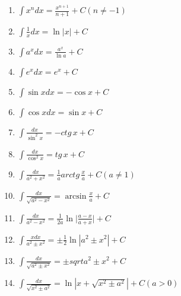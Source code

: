 \documentclass[12pt]{article}
\begin{document}
    \begin{enumerate}
        \item $\int x^n d x = \frac{x^{n+1}}{n+1} + C (n \neq -1)$
        \item $\int \frac 1 x dx = \ln | x | + C$
        \item $\int a^x d x = \frac{a^x}{\ln a} + C$
        \item $\int e^x d x = e^x + C$
        \item $\int \sin x d x = - \cos x + C$
        \item $\int \cos x d x = \sin x + C$
        \item $\int \frac{dx}{\sin^2 x} = - ctg \, x + C$
        \item $\int \frac{dx}{\cos^2 x} = tg \, x + C$
        \item $\int \frac{dx}{a^2 + x^2} = \frac 1 a arctg \, \frac x a + C (a \neq 1)$
        \item $\int \frac{dx}{\sqrt{a^2 - x^2}} = \arcsin \frac x a + C$
        \item $\int \frac{dx}{a^2 - x^2} = \frac 1 {2a} \ln \bigg| \frac{a - x}{a+ x} \bigg| + C$
        \item $\int \frac{xdx}{a^2 \pm x^2} = \pm \frac 1 2 \ln | a^2 \pm x^2 | + C$
        \item $\int \frac{dx}{\sqrt{a^2 \pm x^2}} = \pm sqrt{a^2 \pm x^2} + C$
        \item $\int \frac{dx}{\sqrt{x^2 \pm a^2}} = \ln | x + \sqrt{x^2 \pm a^2} | + C (a > 0)$
    \end{enumerate}
\end{document}
